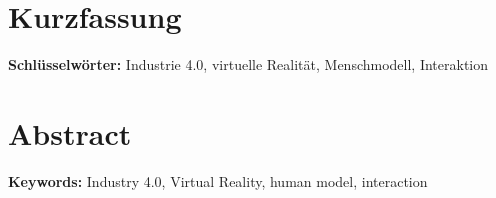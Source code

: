 \chapter*{Kurzfassung}\label{cha:Kurzfassung}

\lipsum[6]
\newline\newline
\textbf{Schlüsselwörter:} Industrie 4.0, virtuelle Realität, Menschmodell, Interaktion

\begingroup
\let\clearpage\relax
\chapter*{Abstract}\label{sec:Abstract}

\lipsum[6]
\newline\newline
\textbf{Keywords:} Industry 4.0, Virtual Reality, human model, interaction

\endgroup